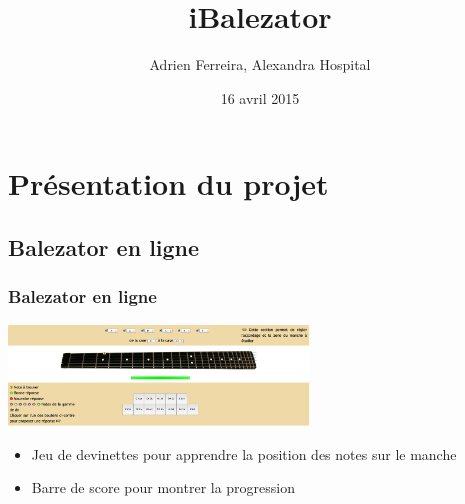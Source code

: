 \documentclass{beamer}
\title{iBalezator}
\author{Adrien Ferreira, Alexandra Hospital}
\institute{PSAR - UPMC}
\date{16 avril 2015}
\begin{document}
   \begin{frame}

      \titlepage

   \end{frame}






\section{Présentation du projet}

	\subsection{Balezator en ligne}

	\begin{frame}

		\frametitle{Balezator en ligne}
			\begin{center}
				\includegraphics[width=8cm]{images/balezator_manche.png}
			\end{center}
			\begin{itemize}
				\item Jeu de devinettes pour apprendre la position des notes sur le manche
				\item Barre de score pour montrer la progression
			\end{itemize}
	\end{frame} 

\end{document}
